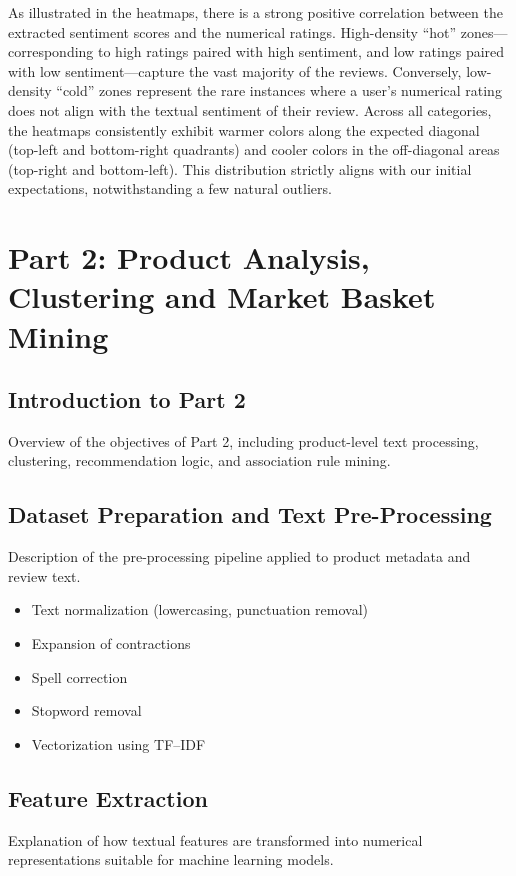 \documentclass[a4paper, 12pt]{article}
\begin{document}
As illustrated in the heatmaps, there is a strong positive correlation between the extracted sentiment scores and the numerical ratings. High-density ``hot'' zones---corresponding to high ratings paired with high sentiment, and low ratings paired with low sentiment---capture the vast majority of the reviews. Conversely, low-density ``cold'' zones represent the rare instances where a user's numerical rating does not align with the textual sentiment of their review. Across all categories, the heatmaps consistently exhibit warmer colors along the expected diagonal (top-left and bottom-right quadrants) and cooler colors in the off-diagonal areas (top-right and bottom-left). This distribution strictly aligns with our initial expectations, notwithstanding a few natural outliers.


\section{Part 2: Product Analysis, Clustering and Market Basket Mining}

\subsection{Introduction to Part 2}
Overview of the objectives of Part 2, including product-level text processing, clustering, recommendation logic, and association rule mining.

\subsection{Dataset Preparation and Text Pre-Processing}
Description of the pre-processing pipeline applied to product metadata and review text.

\begin{itemize}
    \item Text normalization (lowercasing, punctuation removal)
    \item Expansion of contractions
    \item Spell correction
    \item Stopword removal
    \item Vectorization using TF--IDF
\end{itemize}

\subsection{Feature Extraction}
Explanation of how textual features are transformed into numerical representations suitable for machine learning models.
\end{document}
